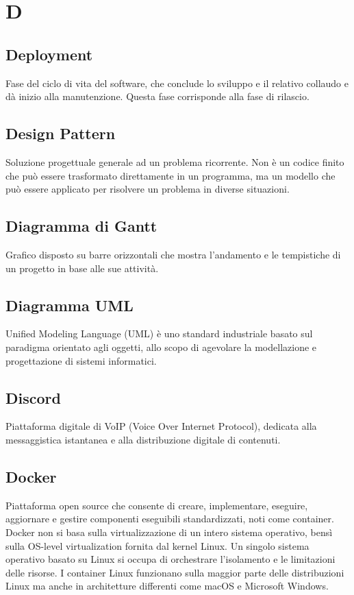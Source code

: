 \documentclass[12pt]{article}
\begin{document}
	\section{D}
		\subsection{Deployment}
			Fase del ciclo di vita del software, che conclude lo sviluppo e il relativo collaudo e dà inizio alla manutenzione. Questa fase corrisponde alla fase di rilascio.
		\subsection{Design Pattern}
			Soluzione progettuale generale ad un problema ricorrente. Non è un codice finito che può essere trasformato direttamente in un programma, ma un modello che può essere applicato per risolvere un problema in diverse situazioni.
		\subsection{Diagramma di Gantt}
			Grafico disposto su barre orizzontali che mostra l'andamento e le tempistiche di un progetto in base alle sue attività.
		\subsection{Diagramma UML}
			Unified Modeling Language (UML) è uno standard industriale basato sul paradigma orientato agli oggetti, allo scopo di agevolare la modellazione e progettazione di sistemi informatici.
		\subsection{Discord}
			Piattaforma digitale di VoIP (Voice Over Internet Protocol), dedicata alla messaggistica istantanea e alla distribuzione digitale di contenuti.
		\subsection{Docker}
			Piattaforma open source che consente di creare, implementare, eseguire, aggiornare e gestire componenti eseguibili standardizzati, noti come container. Docker non si basa sulla virtualizzazione di un intero sistema operativo, bensì sulla OS-level virtualization fornita dal kernel Linux. Un singolo sistema operativo basato su Linux si occupa di orchestrare l'isolamento e le limitazioni delle risorse. I container Linux funzionano sulla maggior parte delle distribuzioni Linux ma anche in architetture differenti come macOS e Microsoft Windows.
\end{document}
